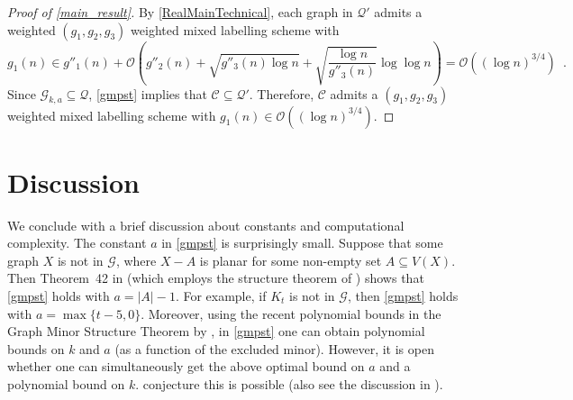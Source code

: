 \documentclass{patmorin}
\newcommand{\Oh}{\mathcal{O}}
\begin{document}
\begin{proof}[Proof of \cref{main_result}]
     By \cref{RealMainTechnical}, each graph in $\mathcal{Q}'$ admits a weighted $(g_1,g_2,g_3)$ weighted mixed labelling scheme with
     \[
       g_1(n) \in g''_1(n) + \Oh\left(g''_2(n) + \sqrt{g''_3(n)\log n}
       + \sqrt{\frac{\log n}{g''_3(n)}}\log\log n\right) = \Oh((\log n)^{3/4}) \enspace.
     \]
     Since $\mathcal{G}_{k,a}\subseteq\mathcal{Q}$, \cref{gmpst} implies that $\mathcal{C}\subseteq\mathcal{Q}'$.  Therefore, $\mathcal{C}$ admits a $(g_1,g_2,g_3)$ weighted mixed labelling scheme with $g_1(n)\in \Oh((\log n)^{3/4})$.
  \end{proof}


\section{Discussion}\label{conclusion}

We conclude with a brief discussion about constants and computational complexity.  The constant $a$ in \cref{gmpst} is surprisingly small. Suppose that some graph $X$ is not in $\mathcal{G}$, where $X-A$ is planar for some non-empty set $A\subseteq V(X)$. Then Theorem~42 in \citep{dujmovic.joret.ea:planar} (which employs the structure theorem of \citet{DvoTho}) shows that \cref{gmpst} holds with $a=|A|-1$. For example, if $K_t$ is not in $\mathcal{G}$, then \cref{gmpst} holds with $a=\max\{t-5,0\}$. Moreover, using the recent polynomial bounds in the Graph Minor Structure Theorem by \citet{gorsky2025polynomial}, in \cref{gmpst} one can obtain polynomial bounds on $k$ and $a$ (as a function of the excluded minor). However, it is open whether one can simultaneously get the above optimal bound on $a$ and a polynomial bound on $k$. \citet[Conjecture~18.9]{gorsky2025polynomial} conjecture this is possible (also see the discussion in \citep{GSW26}).
\end{document}
